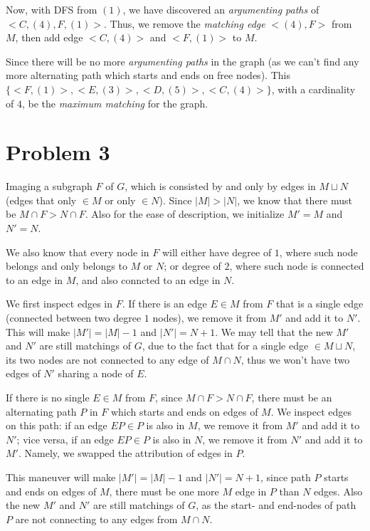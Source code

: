 \documentclass[11pt]{article}
\begin{document}
Now, with DFS from $(1)$, we have discovered an \textit{argumenting paths} of $<C, (4), F, (1)>$. Thus, we remove the \textit{matching edge} $<(4), F>$ from $M$, then add edge $<C, (4)>$ and $<F, (1)>$ to $M$.\newline

Since there will be no more \textit{argumenting paths} in the graph (as we can't find any more alternating path which starts and ends on free nodes). This $\{ <F, (1)>, <E, (3)>, <D, (5)>, <C, (4)> \}$, with a cardinality of $4$, be the \textit{maximum matching} for the graph.

\section{Problem 3}

Imaging a subgraph $F$ of $G$, which is consisted by and only by edges in $M \sqcup N$ (edges that only $\in M$ or only $\in N$). Since $|M| > |N|$, we know that there must be $M \cap F > N \cap F$. Also for the ease of description, we initialize $M' = M$ and $N' = N$.

We also know that every node in $F$ will either have degree of $1$, where such node belongs and only belongs to $M$ or $N$; or degree of $2$, where such node is connected to an edge in $M$, and also conncted to an edge in $N$. \newline


We first inspect edges in $F$. If there is an edge $E \in M$ from $F$ that is a single edge (connected between two degree $1$ nodes), we remove it from $M'$ and add it to $N'$. This will make $|M'| = |M| - 1$ and $|N'| = N + 1$. We may tell that the new $M'$ and $N'$ are still matchings of $G$, due to the fact that for a single edge $\in M \sqcup N$, its two nodes are not connected to any edge of $M \cap N$, thus we won't have two edges of $N'$ sharing a node of $E$.\newline



If there is no single $E \in M$ from $F$, since $M \cap F > N \cap F$, there must be an alternating path $P$ in $F$ which starts and ends on edges of $M$. We inspect edges on this path: if an edge $EP \in P$ is also in $M$, we remove it from $M'$ and add it to $N'$; vice versa, if an edge $EP \in P$ is also in $N$, we remove it from $N'$ and add it to $M'$. Namely, we swapped the attribution of edges in $P$.

This maneuver will make $|M'| = |M| - 1$ and $|N'| = N + 1$, since path $P$ starts and ends on edges of $M$, there must be one more $M$ edge in $P$ than $N$ edges. Also the new $M'$ and $N'$ are still matchings of $G$, as the start- and end-nodes of path $P$ are not connecting to any edges from $M \cap N$.\newline
\end{document}
